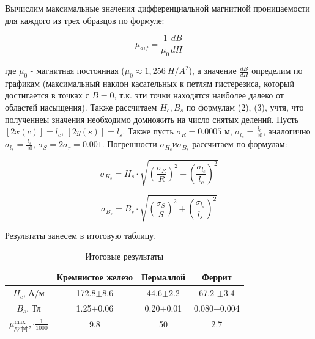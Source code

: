 Вычислим максимальные значения дифференциальной магнитной проницаемости  для каждого из трех образцов по формуле:

\begin{equation}\label{}
    \mu_{dif}=\frac{1}{\mu_0}\frac{dB}{dH}
\end{equation}


где $\mu_0$ - магнитная постоянная ($\mu_0\approx1,256~ H/A^2$), а значение $\frac{dB}{dH}$ определим по графикам (максимальный наклон касательных к петлям гистерезиса, который достигается в точках с $B=0$, т.к. эти точки находятся наиболее далеко от областей насыщения).
\newline
Также рассчитаем $H_c, B_s$ по формулам (2), (3), учтя, что полученнеы значения необходимо домножить на число снятых делений.
\newline
Пусть $[2x(c)] = l_c$, $[2y(s)] = l_s$.
\newline
Также пусть $\sigma_R = 0.0005$ м, $\sigma_{l_c} = \frac{l_c}{10}$, аналогично $\sigma_{l_s} = \frac{l_s}{10}$, $\sigma_S = 2\sigma_r = 0.001$.
\newline
Погрешности $\sigma_{H_c} и \sigma_{B_s}$ рассчитаем по формулам:

\begin{equation}\label{}
\sigma_{H_s} = H_s\cdot\sqrt{(\frac{\sigma_R}{R})^2 + (\frac{\sigma_{l_c}}{l_c})^2}
\end{equation}


\begin{equation}\label{}
\sigma_{B_s} = B_s\cdot \sqrt{(\frac{\sigma_S}{S})^2 + (\frac{\sigma_{l_s}}{l_s})^2}
\end{equation}



Результаты занесем в итоговую таблицу. 

\begin{table}[h!]
	\centering
	\caption{Итоговые результаты}
    \begin{tabular}{|c|c|c|c|}
	\hline 
		& Кремнистое железо & Пермаллой & Феррит \\
		\hline 
		$H_c$, А/м & 172.8$\pm$8.6 & 44.6$\pm$2.2 & 67.2 $\pm$3.4\\
		\hline
		$B_s$, Тл &  1.25$\pm$0.06 & 0.20$\pm$0.01 & 0.080$\pm$0.004\\
		\hline
		$\mu_{\text{дифф}}^{\max}, \cdot \frac{1}{1000}$ & 9.8 & 50 & 2.7\\
        \hline
	    \end{tabular}%
	    
\label{resT}%
\end{table}%



